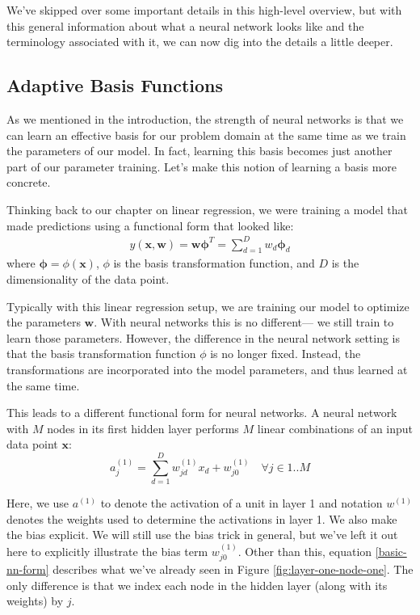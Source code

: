 We've skipped over some important details in this high-level overview, but with this general information about what a neural network looks like and the terminology associated with it, we can now dig into the details a little deeper.

\subsection{Adaptive Basis Functions}
As we mentioned in the introduction, the strength of neural networks is that we can learn an effective basis for our problem domain at the same time as we train the parameters of our model. In fact, learning this basis becomes just another part of our parameter training. Let's make this notion of learning a basis more concrete.

Thinking back to our chapter on linear regression, we were training a model that made predictions using a functional form that looked like:
\begin{align*}
	y(\textbf{x}, \textbf{w}) = \textbf{w} \boldsymbol{\phi}^{T} = \sum_{d=1}^{D} w_{d} \boldsymbol{\phi}_{d}
\end{align*}
where $\boldsymbol{\phi} = \phi(\textbf{x})$, $\phi$ is the basis transformation function, and $D$ is the dimensionality of the data point.

Typically with this linear regression setup, we are training our model to optimize the parameters $\textbf{w}$. With neural networks this is no different--- we still train to learn those parameters. However, the difference in the neural network setting is that the basis transformation function $\phi$ is no longer fixed. Instead, the transformations are incorporated into the model parameters, and thus learned at the same time.

This leads to a different functional form for neural networks. A neural network with $M$ nodes in its first hidden layer  performs $M$ linear combinations of an input data point $\textbf{x}$:
\begin{equation} \label{basic-nn-form}
	a^{(1)}_{j} = \sum_{d=1}^{D} w_{jd}^{(1)} x_{d} + w_{j0}^{(1)} \quad \forall j \in 1..M
      \end{equation}

      Here, we use $a^{(1)}$ to denote the activation of a unit in layer 1 and notation $w^{(1)}$  denotes the weights used to determine the activations in layer 1. We also make the bias explicit.
      We will still use the bias trick in general, but we've left it out here to
      explicitly illustrate the bias term
      $w_{j0}^{(1)}$.
      Other than this,  equation \ref{basic-nn-form} describes what we've already seen in Figure \ref{fig:layer-one-node-one}. The only difference is that we index each node in the hidden layer (along with its weights) by $j$.

